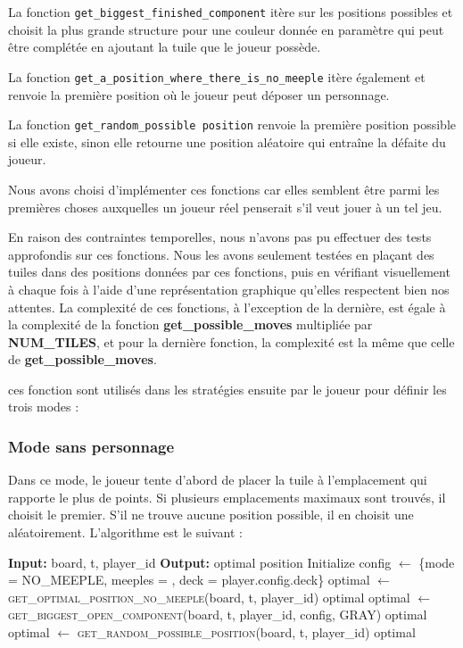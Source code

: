 \documentclass[10pt]{article}
\begin{document}
La fonction \texttt{get\_biggest\_finished\_component} itère sur les positions possibles et choisit la plus grande structure pour une couleur donnée en paramètre qui peut être complétée en ajoutant la tuile que le joueur possède.

La fonction \texttt{get\_a\_position\_where\_there\_is\_no\_meeple} itère également et renvoie la première position où le joueur peut déposer un personnage.

La fonction \texttt{get\_random\_possible
position} renvoie la première position possible si elle existe, sinon elle retourne une position aléatoire qui entraîne la défaite du joueur.

Nous avons choisi d'implémenter ces fonctions car elles semblent être parmi les premières choses auxquelles un joueur réel penserait s'il veut jouer à un tel jeu.

En raison des contraintes temporelles, nous n'avons pas pu effectuer des tests approfondis sur ces fonctions. Nous les avons seulement testées en plaçant des tuiles dans des positions données par ces fonctions, puis en vérifiant visuellement à chaque fois à l'aide d'une représentation graphique qu'elles respectent bien nos attentes.
La complexité de ces fonctions, à l'exception de la dernière, est égale à la complexité de la fonction \textbf{get\_possible\_moves} multipliée par \textbf{NUM\_TILES}, et pour la dernière fonction, la complexité est la même que celle de \textbf{get\_possible\_moves}.

ces fonction sont utilisés dans les stratégies ensuite par le joueur pour définir les trois modes :

\subsubsection{Mode sans personnage}
Dans ce mode, le joueur tente d'abord de placer la tuile à l'emplacement qui rapporte le plus de points. Si plusieurs emplacements maximaux sont trouvés, il choisit le premier. S'il ne trouve aucune position possible, il en choisit une aléatoirement. L'algorithme est le suivant :
\begin{algorithm}[H]
\caption{play\_in\_no\_meeple}
\begin{algorithmic}[1]
\STATE \textbf{Input:} board, t, player\_id
\STATE \textbf{Output:} optimal position
\STATE Initialize config $\gets$ \{mode = NO\_MEEPLE, meeples = , deck = player.config.deck\}
\STATE optimal $\gets$ \textsc{get\_optimal\_position\_no\_meeple}(board, t, player\_id)
    \RETURN optimal
\ENDIF
\STATE optimal $\gets$ \textsc{get\_biggest\_open\_component}(board, t, player\_id, config, GRAY)
    \RETURN optimal
\ENDIF
\STATE optimal $\gets$ \textsc{get\_random\_possible\_position}(board, t, player\_id)
\RETURN optimal
\end{algorithmic}
\end{algorithm}
\end{document}
